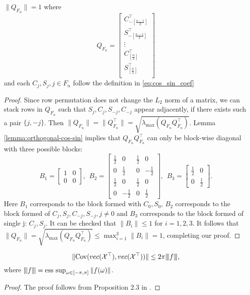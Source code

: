 \begin{lem}
\label{lemma:maximum_L2_Q}
$\|Q_{F_n}\|= 1$
where 
\begin{equation}
Q_{F_n} = \begin{bmatrix}
C_{-[\frac{n-1}{2}]}^\top\\ 
S_{-[\frac{n-1}{2}]}^\top \\
\vdots \\
C_{[\frac{n}{2}]}^\top\\ 
S_{[\frac{n}{2}]}^\top \\
\end{bmatrix}
\end{equation}
and each $C_j, S_j, j\in F_n$ follow the definition in \eqref{eq:cos_sin_coef} 
\begin{proof}
Since row permutation does not change the $L_2$ norm of a matrix, we can stack rows in $Q_{F_n}$ such that $S_j,C_j,S_{-j}, C_{-j}$ appear adjacently, if there exists such a pair $\{j, -j\}$. Then $\|Q_{F_n}\|=\|Q^\top_{F_n}\| = \sqrt{\lambda_{\max}(Q_{F_n}Q_{F_n}^\top)}$. Lemma \ref{lemma:orthogonal-cos-sin} implies that $Q_{F_n}Q_{F_n}^\top$ can only be block-wise diagonal with three possible blocks:
\begin{equation*}
B_1=\begin{bmatrix}
1&0\\
0&0
\end{bmatrix}, ~~B_2 = \begin{bmatrix}
\frac{1}{2} & 0 & \frac{1}{2} & 0\\
0 & \frac{1}{2} & 0 & -\frac{1}{2}\\
\frac{1}{2} & 0 & \frac{1}{2} & 0 \\
0 & -\frac{1}{2} & 0 & \frac{1}{2}
\end{bmatrix}, ~~
B_3 = \begin{bmatrix}
\frac{1}{2} & 0\\
0 & \frac{1}{2}
\end{bmatrix}.
\end{equation*}
Here $B_1$ corresponds to the block formed with $C_0, S_0$, $B_2$ corresponds to the block formed of $C_j, S_j, C_{-j}, S_{-j}, j\neq 0$ and $B_3$ corresponds to the block formed of single j: $C_j, S_j$. 
It can be checked that $\|B_i\| \le 1$ for $i=1,2,3$. 
It follows that $\|Q_{F_n}\|= \sqrt{\lambda_{\max}(Q_{F_n}Q_{F_n}^\top )} \le \max_{i=1}^3 \|B_i\|=1$, completing our proof. 
\end{proof}
\end{lem}


\begin{lem}
\label{lemma:max-L2-norm}
\[
\|\mbox{Cov}(vec(\mathcal{\mathcal{X}}^\top), vec(\mathcal{\mathcal{X}}^\top))\|  \le 2\pi {\left\vert\kern-0.25ex\left\vert\kern-0.25ex\left\vert f \right\vert\kern-0.25ex\right\vert\kern-0.25ex\right\vert},
\]
where $\vertiii{f}=\esssup_{\omega \in [-\pi, \pi]}\|f(\omega)\|$. 
\begin{proof}
The proof follows from Proposition 2.3 in \citet{Basu2015}. 
\end{proof}
\end{lem}


